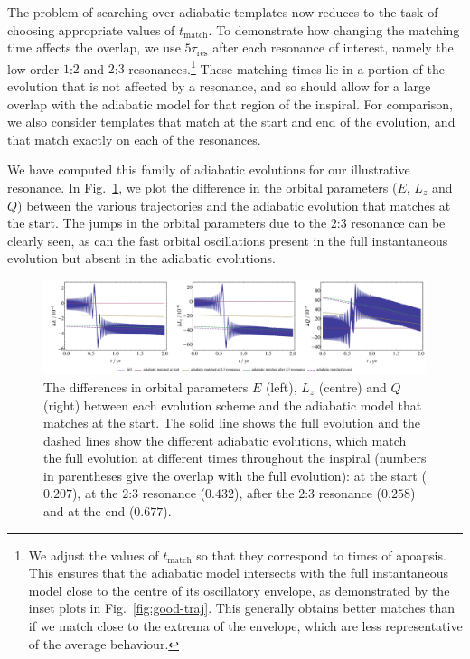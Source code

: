 \documentclass[aps,prd,amsfonts,amssymb,amsmath,nofootinbib,showpacs,superscriptaddress,twocolumn,floatfix]{revtex4-1}
\newcommand{\figref}[1]{Fig.~\ref{fig:#1}}
\newcommand{\sub}[1]{\ensuremath{_\mathrm{#1}}}
\begin{document}
The problem of searching over adiabatic templates now reduces to the task of choosing appropriate values of $t\sub{match}$. To demonstrate how changing the matching time affects the overlap, we use $5\tau\sub{res}$ after each resonance of interest, namely the low-order $1$:$2$ and $2$:$3$ resonances.\footnote{We adjust the values of $t\sub{match}$ so that they correspond to times of apoapsis. This ensures that the adiabatic model intersects with the full instantaneous model close to the centre of its oscillatory envelope, as demonstrated by the inset plots in \figref{good-traj}. This generally obtains better matches than if we match close to the extrema of the envelope, which are less representative of the average behaviour.} These matching times lie in a portion of the evolution that is not affected by a resonance, and so should allow for a large overlap with the adiabatic model for that region of the inspiral. For comparison, we also consider templates that match at the start and end of the evolution, and that match exactly on each of the resonances.


We have computed this family of adiabatic evolutions for our illustrative resonance. In \figref{res-diff-traj}, we plot the difference in the orbital parameters ($E$, $L_z$ and $Q$) between the various trajectories and the adiabatic evolution that matches at the start. The jumps in the orbital parameters due to the $2$:$3$ resonance can be clearly seen, as can the fast orbital oscillations present in the full instantaneous evolution but absent in the adiabatic evolutions.

\begin{figure}
\centering
\includegraphics[width=\textwidth]{Fig_res_diff_traj}
\caption{\label{fig:res-diff-traj}The differences in orbital parameters $E$ (left), $L_z$ (centre) and $Q$ (right) between each evolution scheme and the adiabatic model that matches at the start. The solid line shows the full evolution and the dashed lines show the different adiabatic evolutions, which match the full evolution at different times throughout the inspiral (numbers in parentheses give the overlap with the full evolution): at the start ($0.207$), at the $2$:$3$ resonance ($0.432$), after the $2$:$3$ resonance ($0.258$) and at the end ($0.677$).}
\end{figure}
\end{document}
